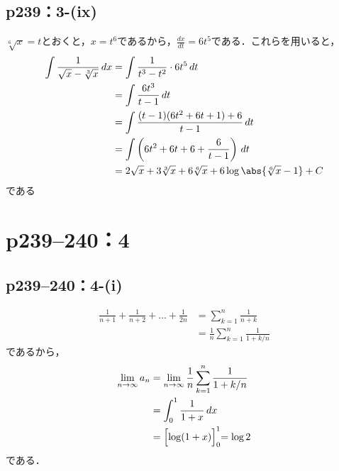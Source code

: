 \documentclass[a4paper,10pt,fleqn]{ltjsarticle}
\begin{document}
\subsection*{p239：3-(ix)}

\begin{tleftbar}
    $\sqrt[6]{x}=t$とおくと，$x=t^6$であるから，$\frac{dx}{dt}=6t^5$である．これらを用いると，
    \begin{align*}
        \int \frac{1}{\sqrt{x}-\sqrt[3]{x}} \, dx & = \int \frac{1}{t^3-t^2} \cdot 6t^5 \, dt                                 \\
                                                  & = \int \frac{6t^3}{t-1} \, dt                                             \\
                                                  & = \int \frac{(t-1)(6t^2+6t+1)+6}{t-1} \, dt                               \\
                                                  & = \int \left (6t^2+6t+6 + \frac{6}{t-1}\right) \, dt                      \\
                                                  & = 2\sqrt{x}+3 \sqrt[3]{x} + 6 \sqrt[6]{x} + 6 \log \abs{\sqrt[6]{x}-1}+ C
    \end{align*}
    である
\end{tleftbar}


\section*{p239--240：4}


\subsection*{p239--240：4-(i)}

\begin{tleftbar}
    \begin{align*}
        \frac{1}{n+1}+ \frac{1}{n+2}+\dots + \frac{1}{2n} & = \sum_{k=1}^{n} \frac{1}{n+k}               \\
                                                          & = \frac{1}{n} \sum_{k=1}^{n} \frac{1}{1+k/n}
    \end{align*}
    であるから，
    \begin{align*}
        \lim_{n \to \infty} a_n & = \lim_{n \to \infty} \frac{1}{n} \sum_{k=1}^{n} \frac{1}{1+k/n} \\
                                & = \int_{0}^{1} \frac{1}{1+x} \, dx                               \\
                                & = \Bigl [ \log (1+x) \Bigl]_{0}^{1} = \log 2
    \end{align*}
    である．
\end{tleftbar}
\end{document}
